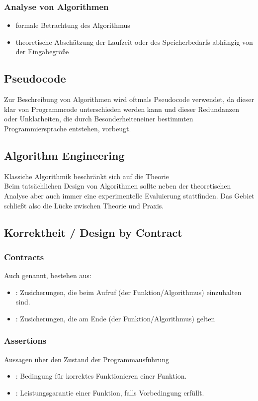 \subsubsection{Analyse von Algorithmen}
\begin{itemize}
    \item formale Betrachtung des Algorithmus
    \item theoretische Abschätzung der Laufzeit oder des Speicherbedarfs abhängig von der Eingabegröße
\end{itemize}

\subsection{Pseudocode}
Zur Beschreibung von Algorithmen wird oftmals Pseudocode verwendet, da dieser klar von Programmcode unterschieden werden kann und dieser Redundanzen oder Unklarheiten, die durch \dq Besonderheiten\dq einer bestimmten Programmiersprache entstehen, vorbeugt.

\subsection{Algorithm Engineering}
Klassiche Algorithmik beschränkt sich auf die Theorie\\
Beim tatsächlichen Design von Algorithmen sollte neben der theoretischen Analyse aber auch immer eine experimentelle Evaluierung stattfinden. Das Gebiet  schließt also die Lücke zwischen Theorie und Praxis.

\subsection{Korrektheit / Design by Contract}
\subsubsection{Contracts}
Auch  genannt, bestehen aus:
\begin{itemize}
    \item {}: Zusicherungen, die beim Aufruf (der Funktion/Algorithmus) einzuhalten sind.
    \item {}: Zusicherungen, die am Ende (der Funktion/Algorithmus) gelten
\end{itemize}
\subsubsection{Assertions}
Aussagen über den Zustand der Programmausführung
\begin{itemize}
    \item {}: Bedingung für korrektes Funktionieren einer Funktion.
    \item {}: Leistungsgarantie einer Funktion, falls Vorbedingung erfüllt.
\end{itemize}

